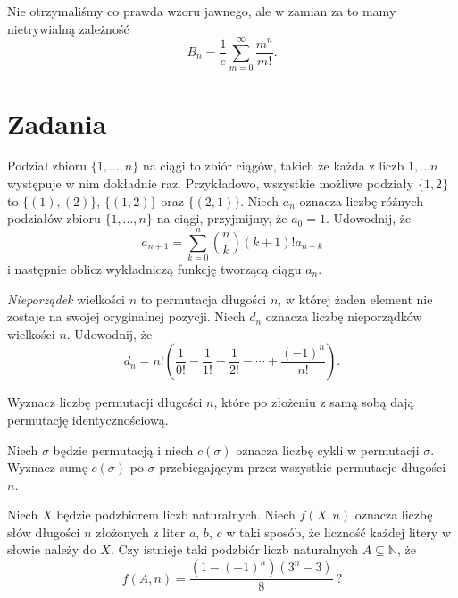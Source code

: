 \documentclass[shortabstract]{imthesis}
\begin{document}
Nie otrzymaliśmy co prawda wzoru jawnego, ale w zamian za to mamy nietrywialną zależność
$$
B_n = \frac{1}{e} \sum_{m=0}^\infty  \frac{m^n}{m!}.
$$

\newpage
\section{Zadania}

\begin{problem} \label{problem:seqpart}
    Podział zbioru $\{1, \ldots, n\}$ na ciągi to zbiór ciągów, takich że każda z liczb $1, \ldots  n$ występuje w nim dokładnie raz. Przykładowo, wszystkie możliwe podziały $\{1, 2\}$ to $\{(1), (2)\}$, $\{(1, 2)\}$ oraz $\{(2, 1)\}$. Niech $a_n$ oznacza liczbę różnych podziałów zbioru $\{1, \ldots, n\}$ na ciągi, przyjmijmy, że $a_0 = 1$. Udowodnij, że
    $$
    a_{n+1} = \sum_{k=0}^n {n \choose k} (k+1)! a_{n-k}
    $$
    i następnie oblicz wykładniczą funkcję tworzącą ciągu $a_n$.
\end{problem}

\begin{problem} \label{problem:derangements}
    \emph{Nieporządek} wielkości $n$ to permutacja długości $n$, w której żaden element nie zostaje na swojej oryginalnej pozycji. Niech $d_n$ oznacza liczbę nieporządków wielkości $n$. Udowodnij, że
    $$
    d_n = n!\left(\frac{1}{0!} - \frac{1}{1!} + \frac{1}{2!} - \cdots + \frac{(-1)^n}{n!}\right).
    $$
\end{problem}

\begin{problem} \label{problem:permunitysqroot}
    Wyznacz liczbę permutacji długości $n$, które po złożeniu z samą sobą dają permutację identycznościową.
\end{problem}

\begin{problem} \label{problem:avgnocyc}
    Niech $\sigma$ będzie permutacją i niech $c(\sigma)$ oznacza liczbę cykli w permutacji $\sigma$. Wyznacz sumę $c(\sigma)$ po $\sigma$ przebiegającym przez wszystkie permutacje długości $n$.
\end{problem}

\begin{problem} \label{problem:expcubed}
    Niech $X$ będzie podzbiorem liczb naturalnych. Niech $f(X, n)$ oznacza liczbę słów długości $n$ złożonych z liter $a$, $b$, $c$ w taki sposób, że liczność każdej litery w słowie należy do $X$. Czy istnieje taki podzbiór liczb naturalnych $A \subseteq \mathbb{N}$, że
    $$
    f(A, n) = \frac{(1-(-1)^n)(3^n-3)}{8}\ ?
    $$
\end{problem}
\end{document}
